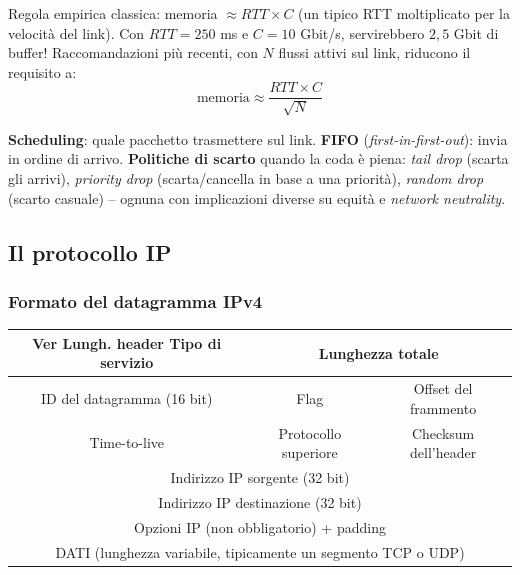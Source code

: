 \documentclass[12pt, a4paper]{article}
\begin{document}
\begin{tcolorbox}[colback=cyan!5, colframe=blue!40!black, title=\textbf{Quanta memoria serve nei buffer? (RFC 3439)}]
Regola empirica classica: memoria $\approx RTT \times C$ (un tipico RTT moltiplicato per la velocità del link). Con $RTT=250$ ms e $C=10$ Gbit/s, servirebbero $2{,}5$ Gbit di buffer! Raccomandazioni più recenti, con $N$ flussi attivi sul link, riducono il requisito a:
$$\text{memoria} \approx \frac{RTT \times C}{\sqrt{N}}$$
\end{tcolorbox}

\textbf{Scheduling}: quale pacchetto trasmettere sul link. \textbf{FIFO} (\textit{first-in-first-out}): invia in ordine di arrivo. \textbf{Politiche di scarto} quando la coda è piena: \textit{tail drop} (scarta gli arrivi), \textit{priority drop} (scarta/cancella in base a una priorità), \textit{random drop} (scarto casuale) -- ognuna con implicazioni diverse su equità e \textit{network neutrality}.

\subsection{Il protocollo IP}

\subsubsection{Formato del datagramma IPv4}

\begin{table}[H]
\centering
\small
\begin{tabular}{|c|c|c|c|}
\hline
\multicolumn{2}{|c|}{Ver \hfill Lungh. header \hfill Tipo di servizio} & \multicolumn{2}{c|}{Lunghezza totale} \\
\hline
\multicolumn{2}{|c|}{ID del datagramma (16 bit)} & Flag & Offset del frammento \\
\hline
Time-to-live & \multicolumn{2}{c|}{Protocollo superiore} & Checksum dell'header \\
\hline
\multicolumn{4}{|c|}{Indirizzo IP sorgente (32 bit)} \\
\hline
\multicolumn{4}{|c|}{Indirizzo IP destinazione (32 bit)} \\
\hline
\multicolumn{4}{|c|}{Opzioni IP (non obbligatorio) + padding} \\
\hline
\multicolumn{4}{|c|}{DATI (lunghezza variabile, tipicamente un segmento TCP o UDP)} \\
\hline
\end{tabular}
\end{table}
\end{document}
